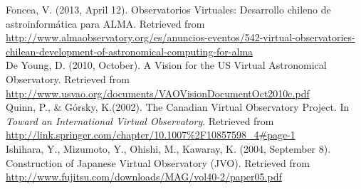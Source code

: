 \documentclass[11pt]{article}
\begin{document}
        Foncea, V. (2013, April 12). Observatorios Virtuales: Desarrollo chileno
de astroinform\'{a}tica para ALMA. Retrieved from
\url{http://www.almaobservatory.org/es/anuncios-eventos/542-virtual-observatories-chilean-development-of-astronomical-computing-for-alma}\\

        De Young, D. (2010, October). A Vision for the US Virtual Astronomical
Observatory. Retrieved from
\url{http://www.usvao.org/documents/VAOVisionDocumentOct2010c.pdf}\\

        Quinn, P., \& G\'{o}rsky, K.(2002). The Canadian Virtual Observatory
Project. In \textit{Toward an International Virtual Observatory}. Retrieved from
\url{http://link.springer.com/chapter/10.1007%2F10857598_4#page-1}\\

        Ishihara, Y., Mizumoto, Y., Ohishi, M., Kawaray, K. (2004, September 8).
Construction of Japanese Virtual Observatory (JVO). Retrieved from
\url{http://www.fujitsu.com/downloads/MAG/vol40-2/paper05.pdf}\\
\end{document}
